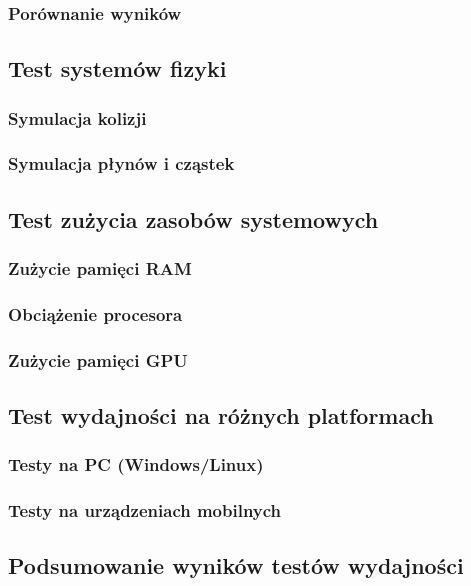 \subsubsection{Porównanie wyników}

\subsection{Test systemów fizyki}
\subsubsection{Symulacja kolizji}

\subsubsection{Symulacja płynów i cząstek}

\subsection{Test zużycia zasobów systemowych}
\subsubsection{Zużycie pamięci RAM}

\subsubsection{Obciążenie procesora}

\subsubsection{Zużycie pamięci GPU}

\subsection{Test wydajności na różnych platformach}
\subsubsection{Testy na PC (Windows/Linux)}

\subsubsection{Testy na urządzeniach mobilnych}

\subsection{Podsumowanie wyników testów wydajności}
